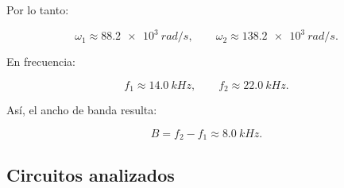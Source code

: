 Por lo tanto:

\begin{equation}
    \omega_1\approx\SI{88.2e3}{rad/s},
    \qquad
    \omega_2\approx\SI{138.2e3}{rad/s}.
\end{equation}

En frecuencia:

\begin{equation}
    f_1\approx\SI{14.0}{kHz},
    \qquad
    f_2\approx\SI{22.0}{kHz}.
\end{equation}

Así, el ancho de banda resulta:

\begin{equation}
    B=f_2-f_1\approx\SI{8.0}{kHz}.
\end{equation}

\subsection{Circuitos analizados}

